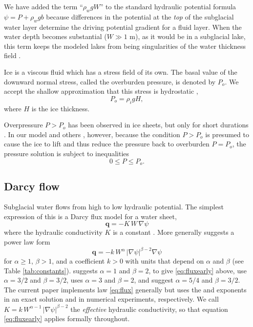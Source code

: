 \documentclass[gmd]{copernicus}   %
\begin{document}
We have added the term ``$\rho_w g W$'' to the standard hydraulic potential formula $\psi = P + \rho_w g b$ \citep{Clarke05,Shreve1972} because differences in the potential at the \emph{top} of the subglacial water layer determine the driving potential gradient for a fluid layer.  When the water depth becomes substantial ($W\gg 1$ m), as it would be in a subglacial lake, this term keeps the modeled lakes from being singularities of the water thickness field \citep[compare][]{LeBrocqetal2009}.

Ice is a viscous fluid which has a stress field of its own.  The basal value of the downward normal stress, called the overburden pressure, is denoted by $P_o$.  We accept the shallow approximation that this stress is hydrostatic \citep{GreveBlatter2009},
\begin{equation} \label{eq:hydrostatic}
  P_o = \rho_i g H,
\end{equation}
where $H$ is the ice thickness.

Overpressure $P>P_o$ has been observed in ice sheets, but only for short durations \citep{Dasetal08}.  In our model and others \citep{Schoofetal2012}, however, because the condition $P>P_o$ is presumed to cause the ice to lift and thus reduce the pressure back to overburden $P=P_o$, the pressure solution is subject to inequalities
\begin{equation}
0 \le P \le P_o. \label{eq:bounds}
\end{equation}

\subsection{Darcy flow}  \label{subsec:darcy}  Subglacial water flows from high to low hydraulic potential.  The simplest expression of this is a Darcy flux model for a water sheet,
\begin{equation}  \label{eq:fluxearly}
\mathbf{q} = - K \,W\, \nabla \psi
\end{equation}
where the hydraulic conductivity $K$ is a constant \citep{Clarke05}.  More generally \cite{Schoofetal2012} suggests a power law form
\begin{equation}  \label{eq:flux}
\mathbf{q} = - k\, W^\alpha\, |\nabla \psi|^{\beta-2} \nabla \psi
\end{equation}
for $\alpha \ge 1$, $\beta>1$, and a coefficient $k>0$ with units that depend on $\alpha$ and $\beta$ (see Table \ref{tab:constants}).  \cite{Clarke05} suggests $\alpha=1$ and $\beta=2$, to give \eqref{eq:fluxearly} above, \cite{CreytsSchoof2009} use $\alpha=3/2$ and $\beta=3/2$, \cite{Hewitt2011,Hewitt2013} uses $\alpha=3$ and $\beta = 2$, and \cite{Hewittetal2012} suggest $\alpha=5/4$ and $\beta=3/2$.  The current paper implements law \eqref{eq:flux} generally but uses the \cite{Clarke05} and \cite{Hewittetal2012} exponents in an exact solution and in numerical experiments, respectively.  We call $K = k\, W^{\alpha-1}\, |\nabla \psi|^{\beta-2}$ the \emph{effective} hydraulic conductivity, so that equation \eqref{eq:fluxearly} applies formally throughout.
\end{document}

